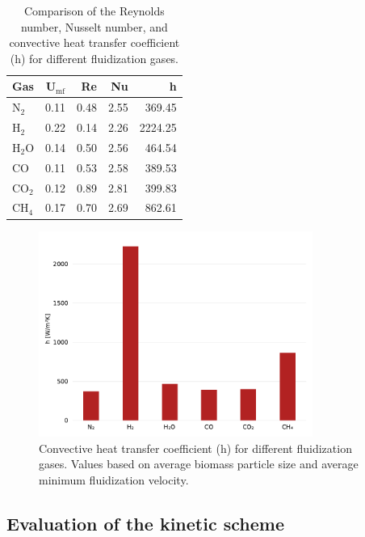 \begin{table}[H]
    \centering
    \caption{Comparison of the Reynolds number, Nusselt number, and convective heat transfer coefficient (h) for different fluidization gases.}
    \label{tab:biomass-hconv}
    \begin{tabular}{lrrrr}
        \toprule
        Gas & U$_\text{mf}$ & Re & Nu & h \\
        \midrule
        N$_2$  & 0.11 & 0.48 & 2.55 & 369.45  \\
        H$_2$  & 0.22 & 0.14 & 2.26 & 2224.25 \\
        H$_2$O & 0.14 & 0.50 & 2.56 & 464.54  \\
        CO     & 0.11 & 0.53 & 2.58 & 389.53  \\
        CO$_2$ & 0.12 & 0.89 & 2.81 & 399.83  \\
        CH$_4$ & 0.17 & 0.70 & 2.69 & 862.61  \\
        \bottomrule
    \end{tabular}
\end{table}

\begin{figure}[H]
    \centering
    \includegraphics[width=0.8\textwidth]{figures/biomass_hconv.pdf}
    \caption{Convective heat transfer coefficient (h) for different fluidization gases. Values based on average biomass particle size and average minimum fluidization velocity.}
    \label{fig:biomass-hconv}
\end{figure}


\subsection{Evaluation of the kinetic scheme}

